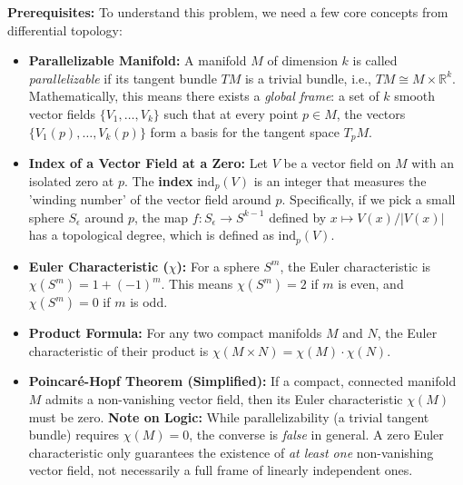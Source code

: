 \begin{solution}
\textbf{Prerequisites:}
To understand this problem, we need a few core concepts from differential topology:
\begin{itemize}
    \item \textbf{Parallelizable Manifold:} A manifold $M$ of dimension $k$ is called \textit{parallelizable} if its tangent bundle $TM$ is a trivial bundle, i.e., $TM \cong M \times \mathbb{R}^k$. Mathematically, this means there exists a \textit{global frame}: a set of $k$ smooth vector fields $\{V_1, \dots, V_k\}$ such that at every point $p \in M$, the vectors $\{V_1(p), \dots, V_k(p)\}$ form a basis for the tangent space $T_pM$.
    \item \textbf{Index of a Vector Field at a Zero:} Let $V$ be a vector field on $M$ with an isolated zero at $p$. The \textbf{index} $\text{ind}_p(V)$ is an integer that measures the 'winding number' of the vector field around $p$. Specifically, if we pick a small sphere $S_\epsilon$ around $p$, the map $f: S_\epsilon \to S^{k-1}$ defined by $x \mapsto V(x)/|V(x)|$ has a topological degree, which is defined as $\text{ind}_p(V)$.
    \item \textbf{Euler Characteristic ($\chi$):} For a sphere $S^m$, the Euler characteristic is $\chi(S^m) = 1 + (-1)^m$. This means $\chi(S^m) = 2$ if $m$ is even, and $\chi(S^m) = 0$ if $m$ is odd.
    \item \textbf{Product Formula:} For any two compact manifolds $M$ and $N$, the Euler characteristic of their product is $\chi(M \times N) = \chi(M) \cdot \chi(N)$.
    \item \textbf{Poincaré-Hopf Theorem (Simplified):} If a compact, connected manifold $M$ admits a non-vanishing vector field, then its Euler characteristic $\chi(M)$ must be zero. \textbf{Note on Logic:} While parallelizability (a trivial tangent bundle) requires $\chi(M) = 0$, the converse is \textit{false} in general. A zero Euler characteristic only guarantees the existence of \textit{at least one} non-vanishing vector field, not necessarily a full frame of linearly independent ones.
\end{itemize}


\end{solution}
